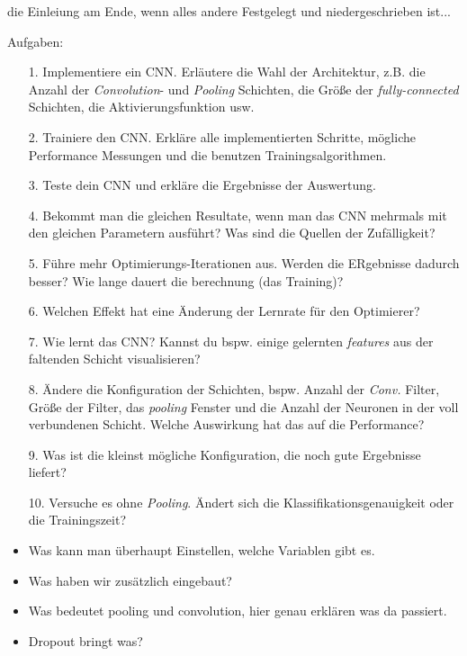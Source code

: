 \documentclass[10pt,journal,compsoc]{IEEEtran}
\begin{document}
\maketitle
\IEEEdisplaynontitleabstractindextext
\IEEEpeerreviewmaketitle
{}
 die Einleiung am Ende, wenn alles andere Festgelegt und niedergeschrieben ist...

{\Large Aufgaben:}
\begin{itemize}
\item[1.] Implementiere ein CNN. Erläutere die Wahl der Architektur, z.B. die Anzahl der \emph{Convolution}- und \emph{Pooling} Schichten, die Größe der \emph{fully-connected} Schichten, die Aktivierungsfunktion usw.
\item [2.] Trainiere den CNN. Erkläre alle implementierten Schritte, mögliche Performance Messungen und die benutzen Trainingsalgorithmen.
\item [3.] Teste dein CNN und erkläre die Ergebnisse der Auswertung.
\item [4.] Bekommt man die gleichen Resultate, wenn man das CNN mehrmals mit den gleichen Parametern ausführt? Was sind die Quellen der Zufälligkeit?
\item [5.] Führe mehr Optimierungs-Iterationen aus. Werden die ERgebnisse dadurch besser? Wie lange dauert die berechnung (das Training)?
\item [6.] Welchen Effekt hat eine Änderung der Lernrate für den Optimierer?
\item [7.] Wie lernt das CNN? Kannst du bspw. einige gelernten \emph{features} aus der faltenden Schicht visualisieren?
\item [8.] Ändere die Konfiguration der Schichten, bspw. Anzahl der \emph{Conv.} Filter, Größe der Filter, das \emph{pooling} Fenster und die Anzahl der Neuronen in der voll verbundenen Schicht. Welche Auswirkung hat das auf die Performance?
\item [9.] Was ist die kleinst mögliche Konfiguration, die noch gute Ergebnisse liefert?
\item [10.] Versuche es ohne \emph{Pooling}. Ändert sich die Klassifikationsgenauigkeit oder die Trainingszeit?
\end{itemize}

\begin{itemize}
\item Was kann man überhaupt Einstellen, welche Variablen gibt es.
\item Was haben wir zusätzlich eingebaut?
\item Was bedeutet pooling und convolution, hier genau erklären was da passiert.
\item Dropout bringt was?
\end{itemize}
\end{document}
